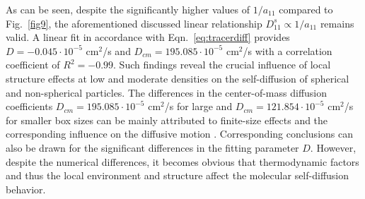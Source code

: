 \documentclass[aip,jcp,reprint]{revtex4-1}
\begin{document}
As can be seen, despite the significantly higher values of $1/a_{11}$ compared to Fig.~\ref{fig9},  the aforementioned discussed linear relationship $D_{11}^s \propto 1/a_{11}$ remains valid. A linear fit in accordance with Eqn.~\eqref{eq:tracerdiff} provides $D=-0.045\cdot 10^{-5}$ cm$^2$/s and $D_{cm}=195.085 \cdot 10^{-5}$ cm$^2$/s with a correlation coefficient  of $R^2 = -0.99$. Such findings reveal the crucial influence of local structure effects at low and moderate densities on the self-diffusion of spherical  and non-spherical particles. The differences in the center-of-mass diffusion coefficients $D_{cm}=195.085 \cdot 10^{-5}$ cm$^2$/s for large and $D_{cm}=121.854 \cdot 10^{-5}$  cm$^2$/s for smaller box sizes can be mainly attributed to finite-size effects and the corresponding influence on the diffusive motion \cite{yeh04a}. Corresponding conclusions can also be drawn for the significant differences in the fitting parameter $D$. However, despite the numerical differences, it becomes obvious that thermodynamic factors and thus the local environment and structure affect the molecular self-diffusion behavior. 
\end{document}
